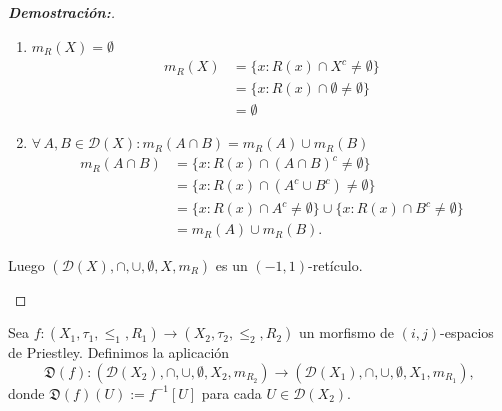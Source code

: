 \documentclass[12pt]{book}
\newcommand{\D}{\mathfrak{D}}
\begin{document}
\begin{proof}[{\textbf{Demostración:}}]
\begin{itemize}
\begin{enumerate}
    \item $m_R(X) = \emptyset$
    \begin{align*}
    m_R(X) &= \{x : R(x) \cap X^c \neq \emptyset\}\\
    & = \{x : R(x) \cap \emptyset \neq \emptyset\}\\
    & = \emptyset
    \end{align*}
    \item $\forall\, A,B \in \mathcal{D}(X): m_R(A \cap B) = m_R(A) \cup m_R(B)$
    \begin{align*}
    m_R(A \cap B) &= \{x : R(x) \cap (A \cap B)^c \neq \emptyset\} \\
    &= \{x : R(x) \cap (A^c \cup B^c) \neq \emptyset\} \\
    &= \{x : R(x) \cap A^c \neq \emptyset\} \cup \{x : R(x) \cap B^c \neq \emptyset\} \\
    &= m_R(A) \cup m_R(B).
    \end{align*}
\end{enumerate}
Luego $(\mathcal{D}(X), \cap, \cup, \emptyset, X, m_R)$ es un $(-1,1)$-retículo.


\end{itemize}
\end{proof}

Sea $f: (X_{1}, \tau_{1}, \leq_{1}, R_{1}) \to (X_{2}, \tau_{2}, \leq_{2}, R_{2})$ un morfismo de $(i,j)$-espacios de Priestley. Definimos la aplicación 
\[ \D(f): (\mathcal{D}(X_2
), \cap, \cup, \emptyset, X_2, m_{R_{2}}) \to (\mathcal{D}(X_{1}), \cap, \cup, \emptyset, X_1, m_{R_{1}}),\] 
donde $\D(f)(U) := f^{-1}[U]$ para cada $U \in \mathcal{D}(X_{2})$.
\end{document}
